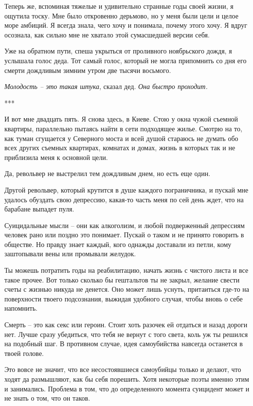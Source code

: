 \documentclass[
]{book}
\begin{document}
Теперь же, вспоминая тяжелые и удивительно странные годы своей жизни, я ощутила тоску. Мне было откровенно дерьмово, но у меня были цели и целое море амбиций. Я всегда знала, чего хочу и понимала, почему этого хочу. Я вдруг осознала, как сильно мне не хватало этой сумасшедшей версии себя.

Уже на обратном пути, спеша укрыться от проливного ноябрьского дождя, я услышала голос деда. Тот самый голос, который не могла припомнить со дня его смерти дождливым зимним утром две тысячи восьмого.

\emph{Молодость -- это такая штука}, сказал дед. \emph{Она быстро проходит.}

***

И вот мне двадцать пять. Я снова здесь, в Киеве. Стою у окна чужой съемной квартиры, параллельно пытаясь найти в сети подходящее жилье. Смотрю на то, как туман сгущается у Северного моста и всей душой стараюсь не думать обо всех других съемных квартирах, комнатах и домах, жизнь в которых так и не приблизила меня к основной цели.

Да, револьвер не выстрелил тем дождливым днем, но есть еще один.

Другой револьвер, который крутится в душе каждого пограничника, и пускай мне удалось обуздать свою депрессию, какая-то часть меня по сей день ждет, что на барабане выпадет пуля.

Суицидальные мысли -- они как алкоголизм, и любой подверженный депрессиям человек рано или поздно это понимает. Пускай о таком и не принято говорить в обществе. Но правду знает каждый, кого однажды доставали из петли, кому заштопывали вены или промывали желудок.

Ты можешь потратить годы на реабилитацию, начать жизнь с чистого листа и все такое прочее. Вот только сколько бы гештальтов ты не закрыл, желание свести счеты с жизнью никуда не денется. Оно может лишь уснуть, притаиться где-то на поверхности твоего подсознания, выжидая удобного случая, чтобы вновь о себе напомнить.

Смерть -- это как секс или героин. Стоит хоть разочек ей отдаться и назад дороги нет. Лучше сразу убедиться, что тебя не вернут с того света, коль уж ты решился на подобный шаг. В противном случае, идея самоубийства навсегда останется в твоей голове.

Это вовсе не значит, что все несостоявшиеся самоубийцы только и делают, что ходят да размышляют, как бы себя порешить. Хотя некоторые поэты именно этим и занимались. Проблема в том, что до определенного момента суицидент может и не знать о том, что он таков. ⠀
\end{document}
